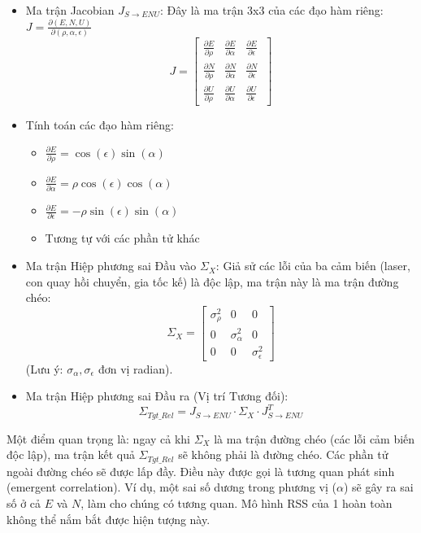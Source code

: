 \begin{enumerate}
\begin{itemize}
            $$E = \rho \cdot \cos(\epsilon) \cdot \sin(\alpha)$$
            $$N = \rho \cdot \cos(\epsilon) \cdot \cos(\alpha)$$
            $$U = \rho \cdot \sin(\epsilon)$$
        
        \item Ma trận Jacobian $J_{S \rightarrow ENU}$: Đây là ma trận 3x3 của các đạo hàm riêng:
$J = \frac{\partial(E, N, U)}{\partial(\rho, \alpha, \epsilon)}$
$$ J = \begin{bmatrix} \frac{\partial E}{\partial \rho} & \frac{\partial E}{\partial \alpha} & \frac{\partial E}{\partial \epsilon} \ \\ \frac{\partial N}{\partial \rho} & \frac{\partial N}{\partial \alpha} & \frac{\partial N}{\partial \epsilon} \ \\ \frac{\partial U}{\partial \rho} & \frac{\partial U}{\partial \alpha} & \frac{\partial U}{\partial \epsilon} \end{bmatrix} $$

    \item Tính toán các đạo hàm riêng:
    \begin{itemize}
        \item $\frac{\partial E}{\partial \rho} = \cos(\epsilon) \sin(\alpha)$
        \item $\frac{\partial E}{\partial \alpha} = \rho \cos(\epsilon) \cos(\alpha)$
        \item $\frac{\partial E}{\partial \epsilon} = -\rho \sin(\epsilon) \sin(\alpha)$
        \item Tương tự với các phần tử khác
    \end{itemize}
    \item Ma trận Hiệp phương sai Đầu vào $\Sigma_X$: Giả sử các lỗi của ba cảm biến (laser, con quay hồi chuyển, gia tốc kế) là độc lập, ma trận này là ma trận đường chéo:
$$ \Sigma_X = \begin{bmatrix} \sigma_\rho^2 & 0 & 0 \\ 0 & \sigma_\alpha^2 & 0 \\ 0 & 0 & \sigma_\epsilon^2 \end{bmatrix} $$
(Lưu ý: $\sigma_\alpha, \sigma_\epsilon$ đơn vị radian).

    \item Ma trận Hiệp phương sai Đầu ra (Vị trí Tương đối):
    $$\Sigma_{Tgt\_Rel} = J_{S \rightarrow ENU} \cdot \Sigma_X \cdot J_{S \rightarrow ENU}^T$$
    \end{itemize}
Một điểm quan trọng là: ngay cả khi $\Sigma_X$ là ma trận đường chéo (các lỗi cảm biến độc lập), ma trận kết quả $\Sigma_{Tgt\_Rel}$ sẽ không phải là đường chéo. Các phần tử ngoài đường chéo sẽ được lấp đầy. Điều này được gọi là tương quan phát sinh (emergent correlation). Ví dụ, một sai số dương trong phương vị ($\alpha$) sẽ gây ra sai số ở cả $E$ và $N$, làm cho chúng có tương quan. Mô hình RSS của 1 hoàn toàn không thể nắm bắt được hiện tượng này.
    
\end{enumerate}
